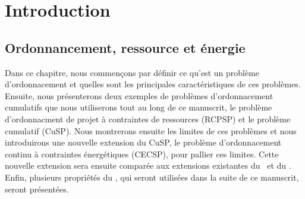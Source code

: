 \cleardoublepage
\begin{minipage}{0.95\linewidth}
  \part{Introduction}
  \vspace{15mm} %
  \parttoc 
\end{minipage}

\chapter{Ordonnancement, ressource et énergie}

Dans ce chapitre, nous commençons par définir ce qu'est un problème
d'ordonnacement et quelles sont les principales caractéristiques de
ces problèmes. Ensuite, nous présenterons deux exemples de problèmes
d'ordonnacement cumulatifs que nous utiliserons tout au long de ce
manuscrit, le problème d'ordonnacment de projet à contraintes de
ressources (RCPSP) et le problème cumulatif (CuSP). Nous montrerons
ensuite les limites de ces problèmes et nous introduirons une nouvelle 
extension du CuSP, le problème d'ordonnacement continu à contraintes
énergétiques (CECSP), pour pallier ces limites. Cette nouvelle
extension sera ensuite comparée aux extensions existantes du \RCPSP~et
du \CUSP.  Enfin, plusieurs propriétés du \CECSP, qui seront utilisées
dans la suite de ce manuscrit, seront présentées.





